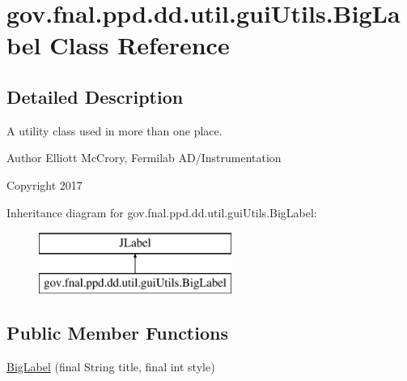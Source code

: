 \hypertarget{classgov_1_1fnal_1_1ppd_1_1dd_1_1util_1_1guiUtils_1_1BigLabel}{\section{gov.\-fnal.\-ppd.\-dd.\-util.\-gui\-Utils.\-Big\-Label Class Reference}
\label{classgov_1_1fnal_1_1ppd_1_1dd_1_1util_1_1guiUtils_1_1BigLabel}
}


\subsection{Detailed Description}
A utility class used in more than one place.

\begin{DoxyAuthor}{Author}
Elliott Mc\-Crory, Fermilab A\-D/\-Instrumentation 
\end{DoxyAuthor}
\begin{DoxyCopyright}{Copyright}
2017 
\end{DoxyCopyright}
Inheritance diagram for gov.\-fnal.\-ppd.\-dd.\-util.\-gui\-Utils.\-Big\-Label\-:\begin{figure}[H]
\begin{center}
\leavevmode
\includegraphics[height=2.000000cm]{classgov_1_1fnal_1_1ppd_1_1dd_1_1util_1_1guiUtils_1_1BigLabel}
\end{center}
\end{figure}
\subsection*{Public Member Functions}
\begin{DoxyCompactItemize}
\item 
\hyperlink{classgov_1_1fnal_1_1ppd_1_1dd_1_1util_1_1guiUtils_1_1BigLabel_a893a2b6ab9309341513be1ae20841a01}{Big\-Label} (final String title, final int style)
\end{DoxyCompactItemize}


